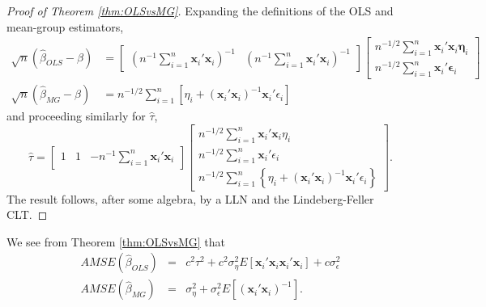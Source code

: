 \begin{proof}[Proof of Theorem \ref{thm:OLSvsMG}]
Expanding the definitions of the OLS and mean-group estimators, 
\begin{align*}
  \sqrt{n} (\widehat{\beta}_{OLS} - \beta) &=  \left[\begin{array}{cc}
    \left(n^{-1}\sum_{i=1}^{n} \mathbf{x}_i'  \mathbf{x}_i\right)^{-1} & \left(n^{-1}\sum_{i=1}^{n} \mathbf{x}_i'  \mathbf{x}_i\right)^{-1}\end{array} \right] 
  \left[\begin{array}{c} 
n^{-1/2}\sum_{i=1}^{n} \mathbf{x}_i'\mathbf{x}_i\mathbf{\eta}_i   \\
n^{-1/2}\sum_{i=1}^{n} \mathbf{x}_i'\mathbf{\epsilon}_i   
\end{array}\right]\\
\sqrt{n} (\widehat{\beta}_{MG} - \beta)  &=  n^{-1/2} \sum_{i=1}^n \left[\eta_i + (\mathbf{x}_i'\mathbf{x}_i)^{-1} \mathbf{x}_i'\epsilon_i\right]
\end{align*}
and proceeding similarly for $\widehat{\tau}$,
\[
\widehat{\tau}  =  
\left[
  \begin{array}{ccc}
  1 & 1& -n^{-1}\sum_{i=1}^n \mathbf{x}_i'\mathbf{x}_i
\end{array}\right] 
\left[\begin{array}{c}
n^{-1/2} \sum_{i=1}^n \mathbf{x}_i'\mathbf{x}_i \eta_i \\
n^{-1/2} \sum_{i=1}^n \mathbf{x}_i'\epsilon_i\\
n^{-1/2} \sum_{i=1}^n \left\{ \eta_i + (\mathbf{x}_i'\mathbf{x}_i)^{-1} \mathbf{x}_i'\epsilon_i\right\} 
\end{array}
\right].
\]
The result follows, after some algebra, by a LLN and the Lindeberg-Feller CLT.
\end{proof}

We see from Theorem \ref{thm:OLSvsMG} that 
\begin{eqnarray}
  AMSE(\widehat{\beta}_{OLS}) &=& c^2 \tau^2 + c^2 \sigma_\eta^2 E[\mathbf{x}_i'\mathbf{x}_i \mathbf{x}_i' \mathbf{x}_i] +  c \sigma_\epsilon^2   \\
  \label{eq:OLSAMSE}
  AMSE(\widehat{\beta}_{MG}) &=& \sigma_\eta^2    + \sigma_\epsilon^2 E[(\mathbf{x}_i'\mathbf{x}_i)^{-1}]
  \label{eq:MGAMSE}.
\end{eqnarray}

